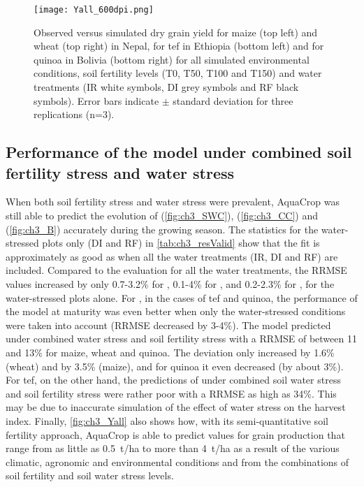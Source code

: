 \begin{figure}[tbhp]
	\centering
		\texttt{[image: Yall\_600dpi.png]}
	\caption{Observed versus simulated dry grain yield for maize (top left) and wheat (top right) in Nepal, for tef in Ethiopia (bottom left) and for quinoa in Bolivia (bottom right) for all simulated environmental conditions, soil fertility levels (T0, T50, T100 and T150) and water treatments (IR white symbols, DI grey symbols and RF black symbols). Error bars indicate $\pm$ standard deviation for three replications (n=3).}
	\label{fig:ch3_Yall}
\end{figure}

\subsection{Performance of the model under combined soil fertility stress and water stress}
When both soil fertility stress and water stress were prevalent, AquaCrop was still able to predict the evolution of \SWCr (\autoref{fig:ch3_SWC}), \CC (\autoref{fig:ch3_CC}) and \B (\autoref{fig:ch3_B}) accurately during the growing season. The statistics for the water-stressed plots only (DI and RF) in \autoref{tab:ch3_resValid} show that the fit is approximately as good as when all the water treatments (IR, DI and RF) are included. Compared to the evaluation for all the water treatments, the RRMSE values increased by only 0.7-3.2\% for \SWCr, 0.1-4\% for \CC, and 0.2-2.3\% for \B, for the water-stressed plots alone. For \B, in the cases of tef and quinoa, the performance of the model at maturity was even better when only the water-stressed conditions were taken into account (RRMSE decreased by 3-4\%). The model predicted \Y under combined water stress and soil fertility stress with a RRMSE of between 11 and 13\% for maize, wheat and quinoa. The deviation only increased by 1.6\% (wheat) and by 3.5\% (maize), and for quinoa it even decreased (by about 3\%). For tef, on the other hand, the predictions of \Y under combined soil water stress and soil fertility stress were rather poor with a RRMSE as high as 34\%. This may be due to inaccurate simulation of the effect of water stress on the harvest index. Finally, \autoref{fig:ch3_Yall} also shows how, with its semi-quantitative soil fertility approach, AquaCrop is able to predict values for grain production that range from as little as \SI{0.5}{t/ha} to more than \SI{4}{t/ha} as a result of the various climatic, agronomic and environmental conditions and from the combinations of soil fertility and soil water stress levels.

